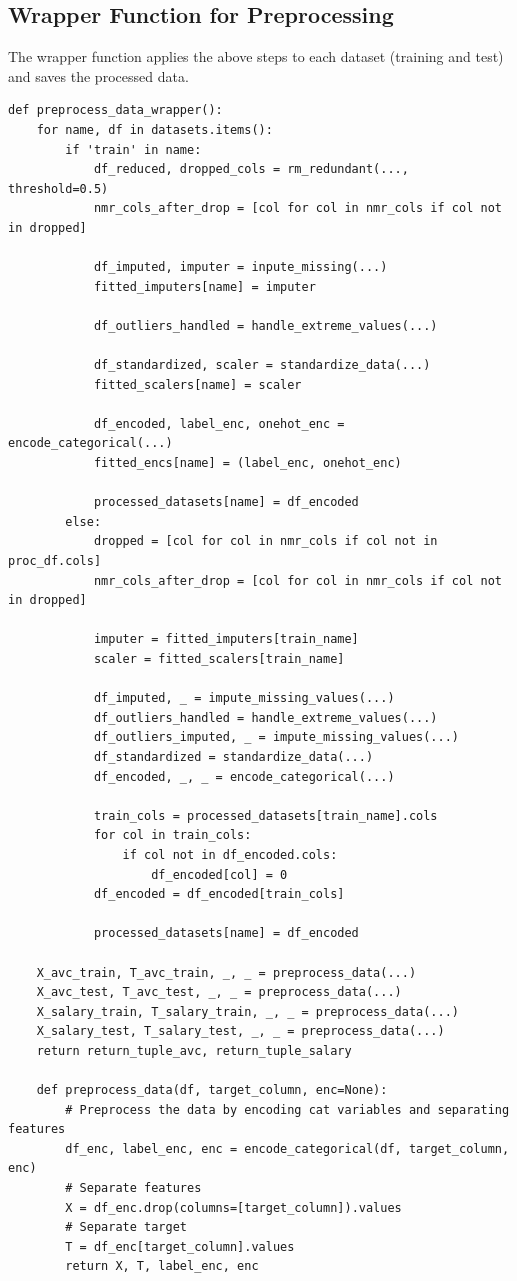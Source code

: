 \documentclass[a4paper,12pt]{article}
\begin{document}
\newpage
\subsection{Wrapper Function for Preprocessing}
The wrapper function applies the above steps to each dataset (training and test) and saves the processed data.

\begin{verbatim}
def preprocess_data_wrapper():
    for name, df in datasets.items():
        if 'train' in name:
            df_reduced, dropped_cols = rm_redundant(..., threshold=0.5)
            nmr_cols_after_drop = [col for col in nmr_cols if col not in dropped]

            df_imputed, imputer = inpute_missing(...)
            fitted_imputers[name] = imputer

            df_outliers_handled = handle_extreme_values(...)

            df_standardized, scaler = standardize_data(...)
            fitted_scalers[name] = scaler

            df_encoded, label_enc, onehot_enc = encode_categorical(...)
            fitted_encs[name] = (label_enc, onehot_enc)

            processed_datasets[name] = df_encoded
        else:
            dropped = [col for col in nmr_cols if col not in proc_df.cols]
            nmr_cols_after_drop = [col for col in nmr_cols if col not in dropped]

            imputer = fitted_imputers[train_name]
            scaler = fitted_scalers[train_name]

            df_imputed, _ = impute_missing_values(...)
            df_outliers_handled = handle_extreme_values(...)
            df_outliers_imputed, _ = impute_missing_values(...)
            df_standardized = standardize_data(...)
            df_encoded, _, _ = encode_categorical(...)

            train_cols = processed_datasets[train_name].cols
            for col in train_cols:
                if col not in df_encoded.cols:
                    df_encoded[col] = 0
            df_encoded = df_encoded[train_cols]

            processed_datasets[name] = df_encoded

    X_avc_train, T_avc_train, _, _ = preprocess_data(...)
    X_avc_test, T_avc_test, _, _ = preprocess_data(...)
    X_salary_train, T_salary_train, _, _ = preprocess_data(...)
    X_salary_test, T_salary_test, _, _ = preprocess_data(...)
    return return_tuple_avc, return_tuple_salary

    def preprocess_data(df, target_column, enc=None):
        # Preprocess the data by encoding cat variables and separating features
        df_enc, label_enc, enc = encode_categorical(df, target_column, enc)
        # Separate features
        X = df_enc.drop(columns=[target_column]).values
        # Separate target
        T = df_enc[target_column].values
        return X, T, label_enc, enc
\end{verbatim}
\end{document}
